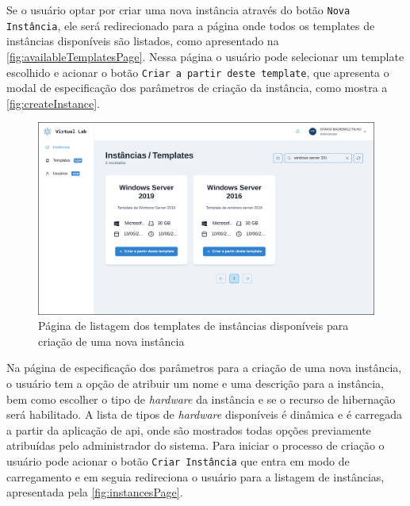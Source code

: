 Se o usuário optar por criar uma nova instância através do botão \texttt{Nova Instância}, ele será redirecionado para a página onde todos os templates de instâncias disponíveis são listados, como apresentado na \autoref{fig:availableTemplatesPage}. Nessa página o usuário pode selecionar um template escolhido e acionar o botão \texttt{Criar a partir deste template}, que apresenta o modal de especificação dos parâmetros de criação da instância, como mostra a \autoref{fig:createInstance}.

\begin{figure}[H]
\caption{Página de listagem dos templates de instâncias disponíveis para criação de uma nova instância}
\label{fig:availableTemplatesPage}
\includegraphics[width=\textwidth]{capitulos/3-resultados/files/available-templates.png}
\end{figure}

Na página de especificação dos parâmetros para a criação de uma nova instância, o usuário tem a opção de atribuir um nome e uma descrição para a instância, bem como escolher o tipo de \textit{hardware} da instância e se o recurso de hibernação será habilitado. A lista de tipos de \textit{hardware} disponíveis é dinâmica e é carregada a partir da aplicação de \gls{api}, onde são mostrados todas opções previamente atribuídas pelo administrador do sistema. Para iniciar o processo de criação o usuário pode acionar o botão \texttt{Criar Instância} que entra em modo de carregamento e em seguia redireciona o usuário para a listagem de instâncias, apresentada pela \autoref{fig:instancesPage}.


